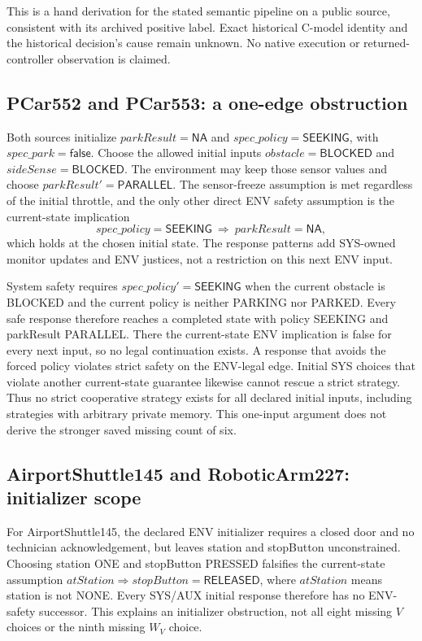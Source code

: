 \documentclass[11pt]{article}
\begin{document}
This is a hand derivation for the stated semantic pipeline on a public
source, consistent with its archived positive label. Exact historical
C-model identity and the historical decision's cause remain unknown.
No native execution or returned-controller observation is claimed.

\subsection{PCar552 and PCar553: a one-edge obstruction}
\label{supp:pcar552553}
Both sources initialize $\mathit{parkResult}=\mathsf{NA}$ and
$\mathit{spec\_policy}=\mathsf{SEEKING}$, with
$\mathit{spec\_park}=\mathsf{false}$. Choose the allowed initial inputs
$\mathit{obstacle}=\mathsf{BLOCKED}$ and
$\mathit{sideSense}=\mathsf{BLOCKED}$. The environment may keep those
sensor values and choose $\mathit{parkResult}'=\mathsf{PARALLEL}$.
The sensor-freeze assumption is met regardless of the initial throttle,
and the only other direct ENV safety assumption is the current-state
implication
\[
 \mathit{spec\_policy}=\mathsf{SEEKING}
       \ \Rightarrow\ \mathit{parkResult}=\mathsf{NA},
\]
which holds at the chosen initial state. The response patterns add
SYS-owned monitor updates and ENV justices, not a restriction on this
next ENV input.

System safety requires $\mathit{spec\_policy}'=\mathsf{SEEKING}$ when
the current obstacle is BLOCKED and the current policy is neither PARKING
nor PARKED. Every safe response therefore reaches a completed state
with policy SEEKING and parkResult PARALLEL. There the current-state
ENV implication is false for every next input, so no legal continuation
exists. A response that avoids the forced policy violates strict safety
on the ENV-legal edge. Initial SYS choices that violate another
current-state guarantee likewise cannot rescue a strict strategy.
Thus no strict cooperative strategy exists for all declared initial inputs,
including strategies with arbitrary private memory. This one-input
argument does not derive the stronger saved missing count of six.

\subsection{AirportShuttle145 and RoboticArm227: initializer scope}
For AirportShuttle145, the declared ENV initializer requires a closed door
and no technician acknowledgement, but leaves station and stopButton
unconstrained. Choosing station ONE and stopButton PRESSED falsifies
the current-state assumption
$\mathit{atStation}\Rightarrow\mathit{stopButton}=\mathsf{RELEASED}$,
where $\mathit{atStation}$ means station is not NONE. Every SYS/AUX initial
response therefore has no ENV-safety successor. This explains an
initializer obstruction, not all eight missing $V$ choices or the ninth
missing $W_V$ choice.
\end{document}
